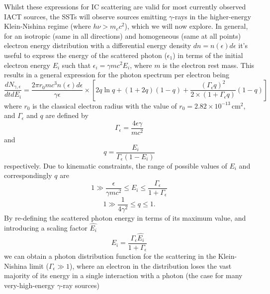 Whilst these expressions for IC scattering are valid for most currently observed IACT sources, the SSTs will observe sources emitting $\gamma$-rays in the higher-energy Klein-Nishina regime \cite{KN} (where $h\nu > m_e c^2$), which we will now explore. In general, for an isotropic (same in all directions) and homogeneous (same at all points) electron energy distribution with a differential energy density $dn = n(\epsilon) d\epsilon$ it's useful to express the energy of the scattered photon ($\epsilon_1$) in terms of the initial electron energy $E_i$ such that $\epsilon_i=\gamma mc^2E_i$, where $m$ is the electron rest mass. This results in a general expression for the photon spectrum per electron being \cite{blumenthal}
\begin{equation}
    \frac{dN_{\gamma,\epsilon}}{dt dE_i}=\frac{2\pi r_0 m c^3 n(\epsilon)d\epsilon}{\gamma \epsilon} \times \left[ 2q \ln q +(1+2q)(1-q)+\frac{(\Gamma_{\epsilon}q)^2}{2\times(1+\Gamma_{\epsilon}q)}(1-q)\right]
    \label{eq:generalphoton}
\end{equation}
where $r_0$ is the classical electron radius with the value of $r_0=2.82\times 10^{-13}\,\mathrm{cm}^2$, and $\Gamma_{\epsilon}$ and $q$ are defined by
\begin{equation}
\Gamma_{\epsilon}=\frac{4\epsilon\gamma}{mc^2}
\label{eq:Gamma}
\end{equation}
and
\begin{equation}
    q=\frac{E_i}{\Gamma_{\epsilon}(1-E_i)}
    \label{eq:q}
\end{equation}
respectively. Due to kinematic constraints, the range of possible values of $E_i$ and correspondingly $q$ are
\begin{equation}
1\gg \frac{\epsilon}{\gamma mc^2}\leq E_i \leq \frac{\Gamma_{\epsilon}}{1+\Gamma_{\epsilon}}
\label{eq:Eilimits}
\end{equation}
\begin{equation}
1\gg \frac{1}{4\gamma^2}\leq q\leq 1.
\label{eq:qlimits}
\end{equation}
By re-defining the scattered photon energy in terms of its maximum value, and introducing a scaling factor $\hat{E_i}$
\begin{equation}
    E_i=\frac{\Gamma_{\epsilon}\hat{E_i}}{1+\Gamma_{\epsilon}} 
\end{equation}
we can obtain a photon distribution function for the scattering in the Klein-Nishina limit ($\Gamma_{\epsilon}\gg 1$), where an electron in the distribution loses the vast majority of its energy in a single interaction with a photon \cite{blumenthal} (the case for many very-high-energy $\gamma$-ray sources)
